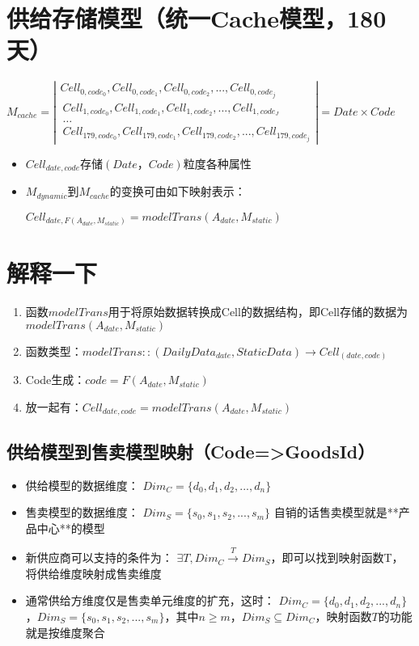 \documentclass[a4paper]{article}
\begin{document}
\section{供给存储模型（统一Cache模型，180天）}
\begin{center}
$M_{cache} = \left|\begin{array}{ccc}
Cell_{0,code_0},Cell_{0,code_1},Cell_{0,code_2},...,Cell_{0,code_j} \\\
Cell_{1,code_0},Cell_{1,code_1},Cell_{1,code_2},...,Cell_{1,code_J} \\\
\dots \\\
Cell_{179,code_0},Cell_{179,code_1},Cell_{179,code_2},...,Cell_{179,code_j}
\end{array} \right|
= Date \times Code$
\end{center}

\begin{itemize}
    \item $Cell_{date,code}$存储$(Date，Code)$粒度各种属性
    \item $M_{dynamic}$到$M_{cache}$的变换可由如下映射表示：
    \begin{center}
        $Cell_{date, F(A_{date},M_{static})} = modelTrans(A_{date},M_{static})$
    \end{center}
\end{itemize}

\section{解释一下}
\begin{enumerate}
\item 函数$modelTrans$用于将原始数据转换成Cell的数据结构，即Cell存储的数据为$modelTrans(A_{date},M_{static})$
\item 函数类型：$modelTrans::(DailyData_{date}, StaticData) \to Cell_{(date,code)}$
\item Code生成：$code=F(A_{date},M_{static})$
\item 放一起有：$Cell_{date,code} = modelTrans(A_{date},M_{static})$
\end{enumerate}
\subsection{ 供给模型到售卖模型映射（Code=>GoodsId）}

\begin{itemize}
\item 供给模型的数据维度：
$Dim_C=\{d_0,d_1,d_2,...,d_n\}$
\item 售卖模型的数据维度：
$Dim_S=\{s_0,s_1,s_2,...,s_m\}$
自销的话售卖模型就是**产品中心**的模型

\item 新供应商可以支持的条件为：
$\exists T, Dim_C  \stackrel{T}{\longrightarrow} Dim_S$，即可以找到映射函数T，将供给维度映射成售卖维度

\item 通常供给方维度仅是售卖单元维度的扩充，这时：
$Dim_C=\{d_0,d_1,d_2,...,d_n\}$，$Dim_S=\{s_0,s_1,s_2,...,s_m\}$，其中$n \ge m，Dim_S  \subseteq Dim_C$，映射函数$T$的功能就是按维度聚合
\end{itemize}
\end{document}
